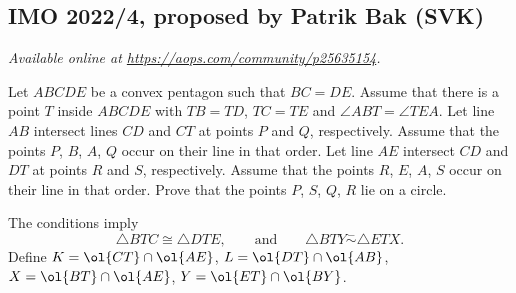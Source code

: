 \documentclass[11pt]{scrartcl}
\begin{document}
\subsection{IMO 2022/4, proposed by Patrik Bak (SVK)}
\textsl{Available online at \url{https://aops.com/community/p25635154}.}
\begin{mdframed}[style=mdpurplebox,frametitle={Problem statement}]
Let $ABCDE$ be a convex pentagon such that $BC=DE$.
Assume that there is a point $T$ inside $ABCDE$
with $TB=TD$, $TC=TE$ and $\angle ABT = \angle TEA$.
Let line $AB$ intersect lines $CD$ and $CT$ at points $P$ and $Q$, respectively.
Assume that the points $P$, $B$, $A$, $Q$ occur on their line in that order.
Let line $AE$ intersect $CD$ and $DT$ at points $R$ and $S$, respectively.
Assume that the points $R$, $E$, $A$, $S$ occur on their line in that order.
Prove that the points $P$, $S$, $Q$, $R$ lie on a circle.
\end{mdframed}
The conditions imply
\[ \triangle BTC \cong \triangle DTE,
  \qquad\text{and}\qquad
  \triangle BTY \overset{-}{\sim} \triangle ETX. \]
Define $K = \ol{CT} \cap \ol{AE}$, $L = \ol{DT} \cap \ol{AB}$,
$X = \ol{BT} \cap \ol{AE}$, $Y = \ol{ET} \cap \ol{BY}$.
\end{document}
